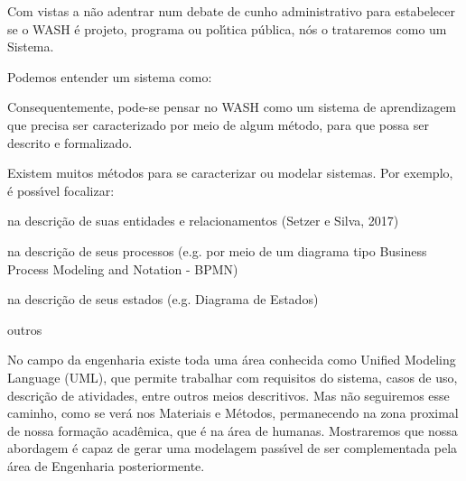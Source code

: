 \documentclass[
12pt,		%
openright,	%
twoside,  %
a4paper,			%
chapter=TITLE,		%
english,			%
french,				%
spanish,			%
brazil				%
]{USPSC-classe/USPSC}
\begin{document}
Com vistas a n\~ao adentrar num debate de cunho administrativo para estabelecer se o WASH \'e projeto, programa ou pol\'{\i}tica p\'ublica, n\'os o trataremos como um Sistema.










Podemos entender um sistema como:











\noindent\begin{center}\mbox{\centering{}}\end{center}


Consequentemente, pode-se pensar no WASH como um sistema de aprendizagem que precisa ser caracterizado por meio de algum m\'etodo, para que possa ser descrito e formalizado.










Existem muitos m\'etodos para se caracterizar ou modelar sistemas. Por exemplo, \'e poss\'{\i}vel focalizar:











\begin{alineas}
\item na descri\c{c}\~ao de suas entidades e relacionamentos  (Setzer e Silva, 2017)
\item na descri\c{c}\~ao de seus processos (e.g. por meio de um diagrama tipo Business Process Modeling and Notation - BPMN)
\item na descri\c{c}\~ao de seus estados (e.g. Diagrama de Estados)
\item outros
\end{alineas}

No campo da engenharia existe toda uma \'area conhecida como Unified Modeling Language (UML), que permite trabalhar com requisitos do sistema, casos de uso, descri\c{c}\~ao de atividades, entre outros meios descritivos. Mas n\~ao seguiremos esse caminho, como se ver\'a nos Materiais e M\'etodos, permanecendo na zona proximal de nossa forma\c{c}\~ao acad\^emica, que \'e na \'area de humanas. Mostraremos que nossa abordagem \'e capaz de gerar uma modelagem pass\'{\i}vel de ser complementada pela \'area de Engenharia posteriormente.
\end{document}
